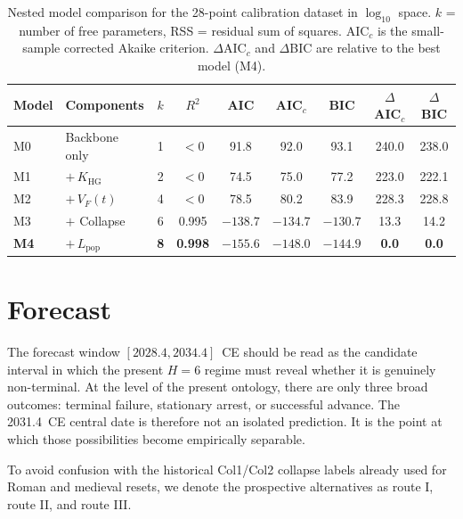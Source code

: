 \documentclass[11pt]{article}
\begin{document}
\begin{table}[htbp]
\centering
\caption{
Nested model comparison for the 28-point calibration dataset in
\(\log_{10}\)
space.
\(k\) = number of free parameters,
RSS = residual sum of squares.
AIC\(_c\) is the small-sample corrected Akaike criterion.
\(\Delta\)AIC\(_c\) and
\(\Delta\)BIC are relative to the best model
(M4).
}
\label{tab:aic}
\begin{tabular}{llccccccc}
\toprule
Model & Components & \(k\) & \(R^2\) & AIC & AIC\(_c\) & BIC & \(\Delta\)AIC\(_c\) & \(\Delta\)BIC \\
\midrule
M0 & Backbone only & 1 & \(<0\) & 91.8 & 92.0 & 93.1 & 240.0 & 238.0 \\
M1 & \(+\,K_{\mathrm{HG}}\) & 2 & \(<0\) & 74.5 & 75.0 & 77.2 & 223.0 & 222.1 \\
M2 & \(+\,V_F(t)\) & 4 & \(<0\) & 78.5 & 80.2 & 83.9 & 228.3 & 228.8 \\
M3 & \(+\) Collapse & 6 & 0.995 & \(-138.7\) & \(-134.7\) & \(-130.7\) & 13.3 & 14.2 \\
\textbf{M4} & \textbf{\(+\,L_{\mathrm{pop}}\)} & \textbf{8} & \textbf{0.998} & \textbf{\(-155.6\)} & \textbf{\(-148.0\)} & \textbf{\(-144.9\)} & \textbf{0.0} & \textbf{0.0} \\
\bottomrule
\end{tabular}
\end{table}

\section{Forecast}

The forecast window
\([2028.4,2034.4]\)~CE
should be read as the candidate interval in which the present
\(H{=}6\)
regime must reveal whether it is genuinely non-terminal.
At the level of the present ontology,
there are only three broad outcomes:
terminal failure,
stationary arrest,
or successful advance.
The 2031.4~CE central date is therefore not an isolated prediction.
It is the point at which those possibilities become empirically separable.

To avoid confusion with the historical Col1/Col2 collapse labels already used for Roman and medieval resets,
we denote the prospective alternatives as route I,
route II,
and route III.
\end{document}
